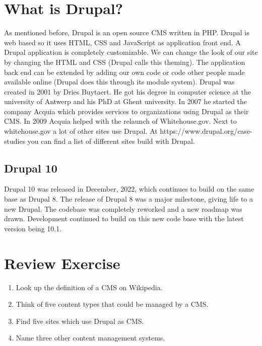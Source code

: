 \section{What is Drupal?}
As mentioned before, Drupal is an open source CMS written in PHP. Drupal is web based so it uses HTML, CSS and JavaScript as application front end. A Drupal application is completely customizable. We can change the look of our site by changing the HTML and CSS (Drupal calls this theming).
The application back end can be extended by adding our own code or code other people made available online (Drupal does this through its module system).
Drupal was created in 2001 by Dries Buytaert. He got his degree in computer science at the university of Antwerp and his PhD at Ghent university. In 2007 he started the company Acquia which provides services to organizations using Drupal as their CMS. In 2009 Acquia helped with the relaunch of Whitehouse.gov. Next to whitehouse.gov a lot of other sites use Drupal. At https://www.drupal.org/case-studies you can find a list of different sites build with Drupal.

\subsection{Drupal 10}
Drupal 10 was released in December, 2022, which continues to build on the same base as Drupal 8. The release of Drupal 8 was a major milestone, giving life to a new Drupal. The codebase was completely reworked and a new roadmap was drawn. Development continued to build on this new code base with the latest version being 10.1.

\section{Review Exercise}
\begin{enumerate}
    \item Look up the definition of a CMS on Wikipedia.
    \item Think of five content types that could be managed by a CMS.
    \item Find five sites which use Drupal as CMS.
    \item Name three other content management systems.
\end{enumerate}
